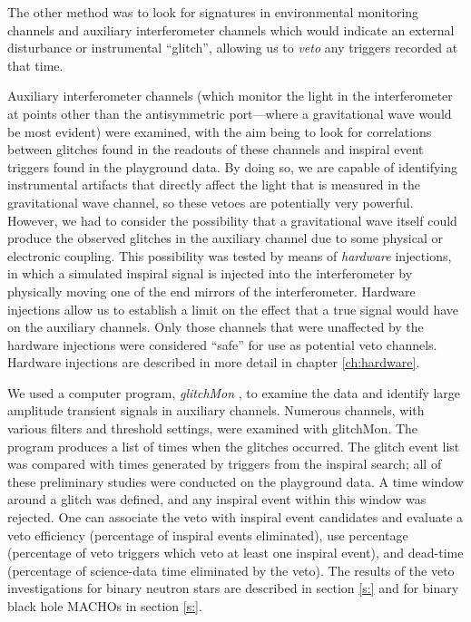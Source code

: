 The other method was to look for signatures in environmental monitoring
channels and auxiliary interferometer channels which would indicate an
external disturbance or instrumental ``glitch'', allowing us to {\it veto} any
triggers recorded at that time.

Auxiliary interferometer channels (which monitor the light in the
interferometer at points other than the antisymmetric port---where a
gravitational wave would be most evident) were examined, with the aim being to
look for correlations between glitches found in the readouts of these channels
and inspiral event triggers found in the playground data.  By doing so, we are
capable of identifying instrumental artifacts that directly affect the light
that is measured in the gravitational wave channel, so these vetoes are
potentially very powerful.  However, we had to consider the possibility that a
gravitational wave itself could produce the observed glitches in the auxiliary
channel due to some physical or electronic coupling.  This possibility was
tested by means of {\em hardware} injections, in which a simulated inspiral
signal is injected into the interferometer by physically moving one of the end
mirrors of the interferometer. Hardware injections allow us to establish a
limit on the effect that a true signal would have on the auxiliary channels.
Only those channels that were unaffected by the hardware injections were
considered ``safe'' for use as potential veto channels. Hardware injections
are described in more detail in chapter \ref{ch:hardware}.

We used a computer program, {\it glitchMon} \cite{glitchMon}, to examine the
data and identify large amplitude transient signals in auxiliary channels.
Numerous channels, with various filters and threshold settings, were examined
with glitchMon. The program produces a list of times when the glitches
occurred. The glitch event list was compared with times generated by triggers
from the inspiral search; all of these preliminary studies were conducted on
the playground data. A time window around a glitch was defined, and any
inspiral event within this window was rejected. One can associate the veto
with inspiral event candidates and evaluate a veto efficiency (percentage of
inspiral events eliminated), use percentage (percentage of veto triggers which
veto at least one inspiral event), and dead-time (percentage of science-data
time eliminated by the veto). The results of the veto investigations for
binary neutron stars are described in section \ref{s:} and for binary black
hole MACHOs in section \ref{s:}.

